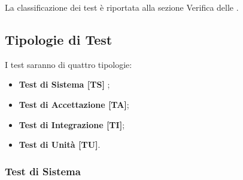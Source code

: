 
La classificazione dei test è riportata alla sezione Verifica delle . \\

\subsection{Tipologie di Test}
I test saranno di quattro tipologie:
\begin{itemize}
	\item \textbf{Test di Sistema [TS] };
	\item \textbf{Test di Accettazione [TA]};
	\item \textbf{Test di Integrazione [TI]};
	\item \textbf{Test di Unità [TU]}.\\
\end{itemize}

\subsubsection{Test di Sistema}


